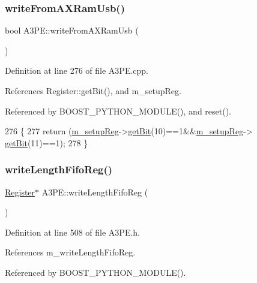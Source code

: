 \subsubsection{\texorpdfstring{write\+From\+A\+X\+Ram\+Usb()}{writeFromAXRamUsb()}}
{\footnotesize\ttfamily bool A3\+P\+E\+::write\+From\+A\+X\+Ram\+Usb (\begin{DoxyParamCaption}{ }\end{DoxyParamCaption})}



Definition at line 276 of file A3\+P\+E.\+cpp.



References Register\+::get\+Bit(), and m\+\_\+setup\+Reg.



Referenced by B\+O\+O\+S\+T\+\_\+\+P\+Y\+T\+H\+O\+N\+\_\+\+M\+O\+D\+U\+L\+E(), and reset().


\begin{DoxyCode}
276                             \{
277   \textcolor{keywordflow}{return} (\hyperlink{classA3PE_a142fa10b7e705c4701ae21678ec2ec8a}{m\_setupReg}->\hyperlink{classRegister_a5d27c9ff548817eee097ba4fdc8e8f69}{getBit}(10)==1&&\hyperlink{classA3PE_a142fa10b7e705c4701ae21678ec2ec8a}{m\_setupReg}->
      \hyperlink{classRegister_a5d27c9ff548817eee097ba4fdc8e8f69}{getBit}(11)==1);
278 \}
\end{DoxyCode}
\mbox{\label{classA3PE_a3b75531731fc939206cce076f7ac9f9a}} 
\subsubsection{\texorpdfstring{write\+Length\+Fifo\+Reg()}{writeLengthFifoReg()}}
{\footnotesize\ttfamily \hyperlink{classRegister}{Register}$\ast$ A3\+P\+E\+::write\+Length\+Fifo\+Reg (\begin{DoxyParamCaption}{ }\end{DoxyParamCaption})\hspace{0.3cm}{\ttfamily [inline]}}



Definition at line 508 of file A3\+P\+E.\+h.



References m\+\_\+write\+Length\+Fifo\+Reg.



Referenced by B\+O\+O\+S\+T\+\_\+\+P\+Y\+T\+H\+O\+N\+\_\+\+M\+O\+D\+U\+L\+E().



